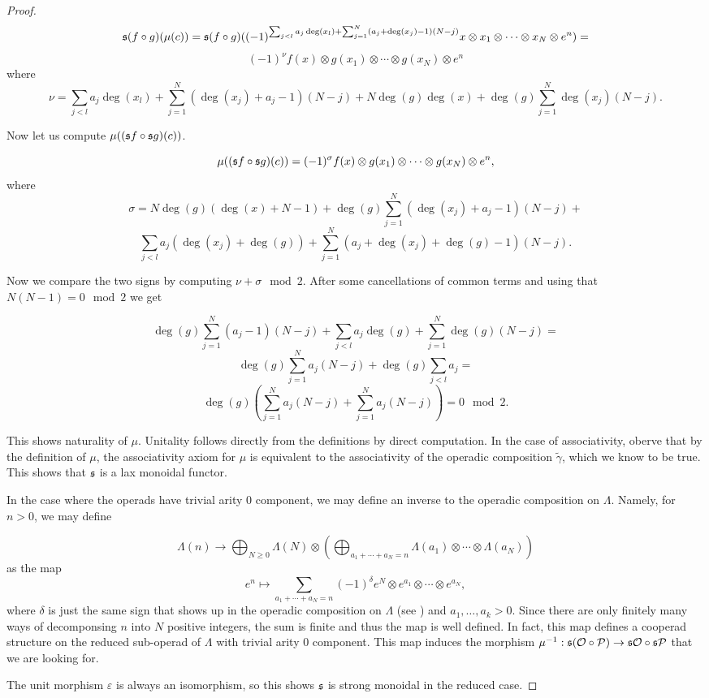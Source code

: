 \documentclass[join.tex]{subfiles}
\begin{document}
\begin{proof}
\[\mathfrak{s}(f\circ g)(\mu(c))=\mathfrak{s}(f\circ g)((-1)^{\sum_{j<l}a_j\deg(x_l)+\sum_{j=1}^N (a_j+\deg(x_j)-1)(N-j)} x\otimes x_1\otimes\cdots\otimes x_N \otimes e^n)=\]
\[(-1)^{\nu}f(x)\otimes g(x_1)\otimes\cdots\otimes g(x_N) \otimes e^n\]
where
\[\nu=\sum_{j<l}a_j\deg(x_l)+\sum_{j=1}^N (\deg(x_j)+a_j-1)(N-j)+N\deg(g)\deg(x)+\deg(g)\sum_{j=1}^N\deg(x_j)(N-j).\]

Now let us compute $\mu((\mathfrak{s} f\circ \mathfrak{s}  g)(c))$. 

\[\mu((\mathfrak{s} f\circ \mathfrak{s}  g)(c))=(-1)^\sigma f(x)\otimes g(x_1)\otimes\cdots\otimes g(x_N) \otimes e^n,\]
where 
\[\sigma=N\deg(g)(\deg(x)+N-1)+\deg(g)\sum_{j=1}^N(\deg(x_j)+a_j-1)(N-j)+\]\[\sum_{j<l}a_j(\deg(x_j)+\deg(g))+\sum_{j=1}^N(a_j+\deg(x_j)+\deg(g)-1)(N-j).\]
 
 Now we compare the two signs by computing $\nu+\sigma\mod 2$. After some cancellations of common terms and using that $N(N-1)=0\mod 2$ we get
 
 \[\deg(g)\sum_{j=1}^N(a_j-1)(N-j)+\sum_{j<l}a_j\deg(g)+\sum_{j=1}^N\deg(g)(N-j)=\]
 \[\deg(g)\sum_{j=1}^Na_j(N-j)+\deg(g)\sum_{j<l}a_j=\]
 \[\deg(g)\left(\sum_{j=1}^N a_j(N-j)+\sum_{j=1}^N a_j(N-j)\right)=0\mod 2.\]
 
 This shows naturality of $\mu$. %
 Unitality follows directly from the definitions by direct computation. In the case of associativity, oberve that by the definition of $\mu$, the associativity axiom for $\mu$ is equivalent to the associativity of the operadic composition $\tilde{\gamma}$, which we know to be true. This shows that $\mathfrak{s}$ is a lax monoidal functor.
 
In the case where the operads have trivial arity 0 component, we may define an inverse to the operadic composition on $\Lambda$. Namely, for $n>0$, we may define

\[\Lambda(n)\to \bigoplus_{N\geq 0} \Lambda(N)\otimes\left(\bigoplus_{a_1+\cdots+a_N=n}\Lambda(a_1)\otimes\cdots\otimes\Lambda(a_N)\right)\]
as the map
\[e^n\mapsto\sum_{a_1+\cdots+a_N=n}(-1)^{\delta}e^N\otimes  e^{a_1}\otimes\cdots\otimes e^{a_N},\]
where $\delta$ is just the same sign that shows up in the operadic composition on $\Lambda$ (see ) and $a_1,\dots,a_k>0$. Since there are only finitely many ways of decomponsing $n$ into $N$ positive integers, the sum is finite and thus the map is well defined. In fact, this map defines a cooperad structure on the reduced sub-operad of $\Lambda$ with trivial arity 0 component. This map induces the morphism $\mu^{-1}:\mathfrak{s}({\mathcal O}\circ\mathcal{P})\to \mathfrak{s}{\mathcal O}\circ\mathfrak{s}\mathcal{P}$ that we are looking for.

The unit morphism $\varepsilon$ is always an isomorphism, so this shows $\mathfrak{s}$ is strong monoidal in the reduced case.

\end{proof}
\end{document}
